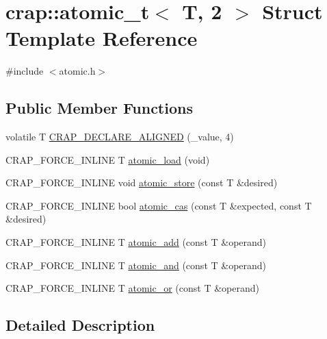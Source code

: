 \hypertarget{structcrap_1_1atomic__t_3_01_t_00_012_01_4}{}\section{crap\+:\+:atomic\+\_\+t$<$ T, 2 $>$ Struct Template Reference}
\label{structcrap_1_1atomic__t_3_01_t_00_012_01_4}


{\ttfamily \#include $<$atomic.\+h$>$}

\subsection*{Public Member Functions}
\begin{DoxyCompactItemize}
\item 
volatile T \hyperlink{structcrap_1_1atomic__t_3_01_t_00_012_01_4_a86a2f87885243f7cc8b5ad809afb9b37}{C\+R\+A\+P\+\_\+\+D\+E\+C\+L\+A\+R\+E\+\_\+\+A\+L\+I\+G\+N\+E\+D} (\+\_\+value, 4)
\item 
C\+R\+A\+P\+\_\+\+F\+O\+R\+C\+E\+\_\+\+I\+N\+L\+I\+N\+E T \hyperlink{structcrap_1_1atomic__t_3_01_t_00_012_01_4_a920490fa2eec5f2691443abb71489284}{atomic\+\_\+load} (void)
\item 
C\+R\+A\+P\+\_\+\+F\+O\+R\+C\+E\+\_\+\+I\+N\+L\+I\+N\+E void \hyperlink{structcrap_1_1atomic__t_3_01_t_00_012_01_4_af68fc89fbc3561488fa6c54206e1a63a}{atomic\+\_\+store} (const T \&desired)
\item 
C\+R\+A\+P\+\_\+\+F\+O\+R\+C\+E\+\_\+\+I\+N\+L\+I\+N\+E bool \hyperlink{structcrap_1_1atomic__t_3_01_t_00_012_01_4_a571d6f5ff982691772eb4d83b101f85c}{atomic\+\_\+cas} (const T \&expected, const T \&desired)
\item 
C\+R\+A\+P\+\_\+\+F\+O\+R\+C\+E\+\_\+\+I\+N\+L\+I\+N\+E T \hyperlink{structcrap_1_1atomic__t_3_01_t_00_012_01_4_ac16a3fc634e7cfb5081cc8d15b48ec2b}{atomic\+\_\+add} (const T \&operand)
\item 
C\+R\+A\+P\+\_\+\+F\+O\+R\+C\+E\+\_\+\+I\+N\+L\+I\+N\+E T \hyperlink{structcrap_1_1atomic__t_3_01_t_00_012_01_4_ab4b3f9d7160a83ecfa0f4cd6130f00a1}{atomic\+\_\+and} (const T \&operand)
\item 
C\+R\+A\+P\+\_\+\+F\+O\+R\+C\+E\+\_\+\+I\+N\+L\+I\+N\+E T \hyperlink{structcrap_1_1atomic__t_3_01_t_00_012_01_4_a680056b92e2a977d2db0e5c6179fcd5f}{atomic\+\_\+or} (const T \&operand)
\end{DoxyCompactItemize}


\subsection{Detailed Description}
